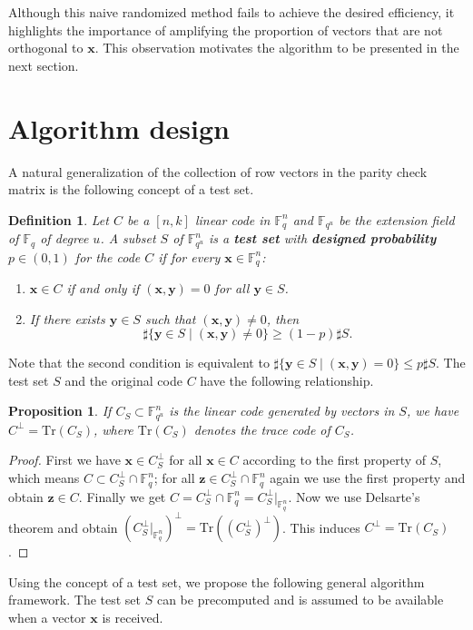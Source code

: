 \documentclass[a4paper, 10pt]{article}
\newtheorem{prop}[theorem]{Proposition}
\newtheorem{deff}[theorem]{Definition}
\begin{document}
Although this naive randomized method fails to achieve the desired efficiency, 
it highlights the importance of amplifying the proportion of vectors that are not orthogonal to $\mathbf{x}$. 
This observation motivates the algorithm to be presented in the next section.


\section{Algorithm design}
A natural generalization of the collection of row vectors in the parity check matrix is the following concept of a test set.
\begin{deff}
    Let $C$ be a $[n,k]$ linear code in $\mathbb{F}_q^n$ and $\mathbb{F}_{q^u}$ be the extension field of $\mathbb{F}_q$ of degree $u$. A subset $S$ of $\mathbb{F}_{q^u}^n$ is a \textbf{test set} with \textbf{designed probability} $p\in (0,1)$ for the code $C$ if for every $\mathbf{x} \in \mathbb{F}_q^n$:
\begin{enumerate}
    \item $\mathbf{x} \in C$ if and only if $(\mathbf{x}, \mathbf{y}) = 0$ for all $\mathbf{y} \in S$.
    \item If there exists $\mathbf{y} \in S$ such that $(\mathbf{x}, \mathbf{y}) \neq 0$, then 
    \begin{equation}
        \sharp\{\mathbf{y}\in S\;|\; (\mathbf{x},\mathbf{y})\not = 0\}\ge (1-p)\sharp S.\label{1}
    \end{equation}
\end{enumerate}
\end{deff}
Note that the second condition is equivalent to $\sharp\{\mathbf{y}\in S\;|\; (\mathbf{x},\mathbf{y}) = 0\}\le p\sharp S$. The test set $S$ and the original code $C$ have the following relationship.
\begin{prop}
    If $C_S\subset \mathbb{F}_{q^u}^n$ is the linear code generated by vectors in $S$, we have $C^\perp = \mathrm{Tr}(C_S)$, where $\mathrm{Tr}(C_S)$ denotes the trace code of $C_S$.
\end{prop}
\begin{proof}
    First we have $\mathbf{x}\in C^\perp_S$ for all $\mathbf{x}\in C$ according to the first property of $S$, which means $C\subset C^\perp_S\cap \mathbb{F}_q^n$; for all $\mathbf{z}\in C_S^\perp \cap \mathbb{F}_q^n$ again we use the first property and obtain $\mathbf{z}\in C$. Finally we get $C=C_S^\perp \cap \mathbb{F}_q^n=C_S^\perp|_ {\mathbb{F}_q^n}$. Now we use Delsarte's theorem and obtain $\left(C_S^\perp|_ {\mathbb{F}_q^n}\right)^\perp = \mathrm{Tr}\left((C_S^\perp)^\perp\right)$. This induces $C^\perp = \mathrm{Tr}(C_S)$.
\end{proof}
Using the concept of a test set, we propose the following general algorithm framework. The test set $S$ can be precomputed and is assumed to be available when a vector $\textbf{x}$ is received.
\end{document}
